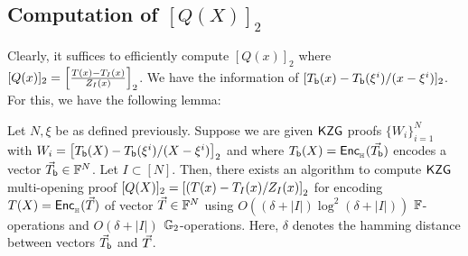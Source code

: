 \subsection{Computation of $[Q(X)]_2$}
Clearly, it suffices to efficiently compute $[Q(x)]_2$ where $[Q(x)]_2=\left[{\frac{T(x)-T_I(x)}{Z_I(x)}}\right]_2$. We have the information of $[T_{\mathsf{b}}({x})-T_{\mathsf{b}}({\xi^i})/(x-\xi^i)]_2$. For this, we have the following lemma:


\begin{lemma}\label{lem:approx-setup}
Let $N,\xi$ be as defined previously. Suppose we are given
$\mathsf{KZG}$ proofs $\{W_i\}_{i=1}^N$ with $W_i=\left[{T_{\mathsf{b}}({X}) - T_{\mathsf{b}}({\xi^i})/(X-\xi^i)}\right]_2$ and where
$T_{\mathsf{b}}({X})=\mathsf{Enc}_{{}_{\mathbb{H}}}(\vec{T_{\mathsf{b}}})$ encodes a vector $\vec{T}_{\mathsf{b}}\in \mathbb{F}^N$.
Let $I \subset [N]$.
Then,
there exists an algorithm to compute $\mathsf{KZG}$ multi-opening proof
$[Q(X)]_2=\left[{(T(x) - T_I(x)/Z_I(x)}\right]_2$ for encoding $T(X)=\mathsf{Enc}_{{}_{\mathbb{H}}}(\vec{T})$ of vector $\vec{T}\in \mathbb{F}^N$ using $O((\delta + |I|) \log^2 (\delta + |I|))$ $\mathbb{F}$-operations and $O(\delta + |I|)$ $\mathbb{G}_2$-operations.
Here, $\delta$ denotes the hamming distance
between vectors $\vec{T}_{\mathsf{b}}$ and $\vec{T}$.
\end{lemma}


